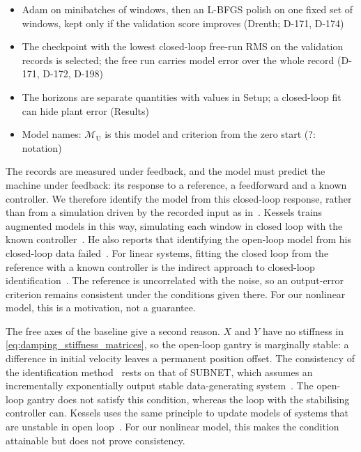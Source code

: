 \begin{itemize}
\item Adam on minibatches of windows, then an L-BFGS polish on one fixed set of windows, kept only if the validation score improves (Drenth; D-171, D-174)
\item The checkpoint with the lowest closed-loop free-run RMS on the validation records is selected; the free run carries model error over the whole record (D-171, D-172, D-198)
\item The horizons are separate quantities with values in Setup; a closed-loop fit can hide plant error (Results)
\item Model names: $\mathcal M_{\mathrm{U}}$ is this model and criterion from the zero start (?: notation)
\end{itemize}
\fi

The records are measured under feedback, and the model must predict the
machine under feedback: its response to a reference, a feedforward and a
known controller.
We therefore identify the model from this closed-loop response, rather than
from a simulation driven by the recorded input as
in~\cite[Eq.~(22)]{hoekstra2026lfr}.
Kessels trains augmented models in this way, simulating each window in closed
loop with the known controller~\cite[Eqs.~(5.12), (5.13)]{kessels2025ai}.
He also reports that identifying the open-loop model from his closed-loop data
failed~\cite[Remark~5.6]{kessels2025ai}.
For linear systems, fitting the closed loop from the reference with a known
controller is the indirect approach to closed-loop
identification~\cite[Sec.~5.2]{forssell1999revisited}.
The reference is uncorrelated with the noise, so an output-error criterion
remains consistent under the conditions given there.
For our nonlinear model, this is a motivation, not a guarantee.

The free axes of the baseline give a second reason.
$X$ and $Y$ have no stiffness in \eqref{eq:damping_stiffness_matrices}, so the
open-loop gantry is marginally stable:
a difference in initial velocity leaves a permanent position offset.
The consistency of the identification method~\cite[Sec.~5.5]{hoekstra2026lfr}
rests on that of SUBNET, which assumes an incrementally exponentially output
stable data-generating system~\cite[Cond.~1]{beintema2023subnet}.
The open-loop gantry does not satisfy this condition, whereas the loop with
the stabilising controller can.
Kessels uses the same principle to update models of systems that are unstable
in open loop~\cite[Ch.~5]{kessels2025ai}.
For our nonlinear model, this makes the condition attainable but does not
prove consistency.

